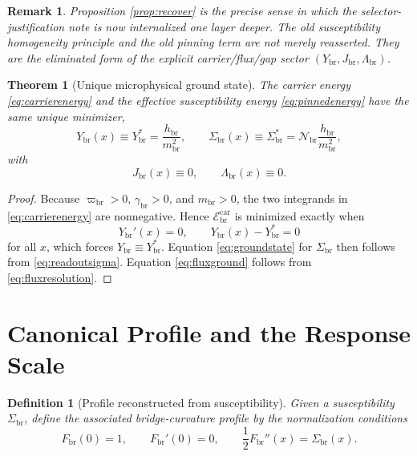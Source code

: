 \documentclass[11pt]{article}
\newcommand{\CurvProfile}{F_{\mathrm{br}}}
\newcommand{\ProfWeight}{\varpi_{\mathrm{br}}}
\newcommand{\RespSus}{\Sigma_{\mathrm{br}}}
\newcommand{\RespSusEq}{\Sigma_{\mathrm{br}}^{\ast}}
\newcommand{\RespCarrier}{Y_{\mathrm{br}}}
\newcommand{\RespCarrierEq}{Y_{\mathrm{br}}^{\ast}}
\newcommand{\RespFlux}{J_{\mathrm{br}}}
\newcommand{\RespCompat}{\Lambda_{\mathrm{br}}}
\newcommand{\RespNorm}{\mathcal N_{\mathrm{br}}}
\newcommand{\RespFluxCoeff}{\gamma_{\mathrm{br}}}
\newcommand{\RespGap}{m_{\mathrm{br}}}
\newcommand{\RespBias}{h_{\mathrm{br}}}
\newcommand{\RespCarrierEnergy}{\mathscr E_{\mathrm{br}}^{\mathrm{car}}}
\newtheorem{definition}{Definition}
\newtheorem{remark}{Remark}
\newtheorem{theorem}{Theorem}
\begin{document}
\begin{remark}
Proposition \ref{prop:recover} is the precise sense in which the selector-justification note is now internalized one layer deeper. The old susceptibility homogeneity principle and the old pinning term are not merely reasserted. They are the eliminated form of the explicit carrier/flux/gap sector \((\RespCarrier,\RespFlux,\RespCompat)\).
\end{remark}

\begin{theorem}[Unique microphysical ground state]
\label{thm:ground}
The carrier energy \eqref{eq:carrierenergy} and the effective susceptibility energy \eqref{eq:pinnedenergy} have the same unique minimizer,
\begin{equation}
\RespCarrier(x)\equiv \RespCarrierEq=\frac{\RespBias}{\RespGap^2},
\qquad
\RespSus(x)\equiv \RespSusEq=\RespNorm\frac{\RespBias}{\RespGap^2},
\label{eq:groundstate}
\end{equation}
with
\begin{equation}
\RespFlux(x)\equiv0,
\qquad
\RespCompat(x)\equiv0.
\label{eq:fluxground}
\end{equation}
\end{theorem}

\begin{proof}
Because \(\ProfWeight>0\), \(\RespFluxCoeff>0\), and \(\RespGap>0\), the two integrands in \eqref{eq:carrierenergy} are nonnegative. Hence \(\RespCarrierEnergy\) is minimized exactly when
\[
\RespCarrier'(x)=0,
\qquad
\RespCarrier(x)-\RespCarrierEq=0
\]
for all \(x\), which forces \(\RespCarrier\equiv\RespCarrierEq\). Equation \eqref{eq:groundstate} for \(\RespSus\) then follows from \eqref{eq:readoutsigma}. Equation \eqref{eq:fluxground} follows from \eqref{eq:fluxresolution}.
\end{proof}

\section{Canonical Profile and the Response Scale}

\begin{definition}[Profile reconstructed from susceptibility]
\label{def:profilereconstruction}
Given a susceptibility \(\RespSus\), define the associated bridge-curvature profile by the normalization conditions
\begin{equation}
\CurvProfile(0)=1,
\qquad
\CurvProfile'(0)=0,
\qquad
\frac12\CurvProfile''(x)=\RespSus(x).
\label{eq:profilereconstruction}
\end{equation}
\end{definition}
\end{document}
